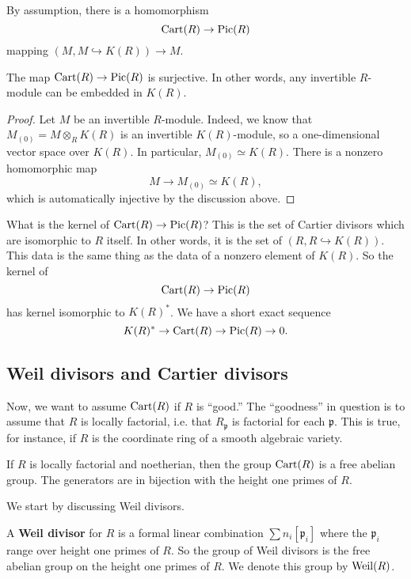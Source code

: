 By assumption, there is a homomorphism
\[ \operatorname{Cart}(R) \to\operatorname{Pic}(R)  \]
mapping $(M, M \hookrightarrow K(R)) \to M$. 

\begin{proposition} 
The map $\operatorname{Cart}(R) \to \operatorname{Pic}(R)$ is surjective. In other words, any invertible
$R$-module can be embedded in $K(R)$.
\end{proposition} 
\begin{proof}  Let $M$ be an invertible $R$-module.
Indeed, we know that $M_{(0)} = M \otimes_R K(R)$ is an invertible
$K(R)$-module, so a one-dimensional vector space over $K(R)$. In particular,
$M_{(0)} \simeq K(R)$. There is a nonzero homomorphic map
\[  M \to M_{(0) } \simeq K(R),  \]
which is automatically injective by the discussion above. 
\end{proof} 

What is the kernel of $\operatorname{Cart}(R) \to \operatorname{Pic}(R)$? This is the set of Cartier divisors which are
isomorphic to $R$ itself. In other words, it is the set of $(R, R
\hookrightarrow K(R))$. This data is the same thing as the data of a nonzero
element of $K(R)$. 
So the kernel of 
\[  \operatorname{Cart}(R) \to \operatorname{Pic}(R)  \]
has kernel isomorphic to $K(R)^*$. We have a short exact sequence
\[  K(R)^* \to \operatorname{Cart}(R) \to \operatorname{Pic}(R) \to 0.  \]

\subsection{Weil divisors and Cartier divisors}

Now, we want to assume $\operatorname{Cart}(R)$ if $R$ is ``good.'' The ``goodness'' in
question is to assume that $R$ is locally factorial, i.e. that
$R_{\mathfrak{p}}$ is factorial for each $\mathfrak{p}$. This is true, for
instance, if $R$ is the coordinate ring of a smooth algebraic variety.



\begin{proposition} 
If $R$ is locally factorial and noetherian, then the group $\operatorname{Cart}(R)$ is a free abelian group.
The generators are in bijection with the height one primes of $R$.
\end{proposition} 

We start by discussing Weil divisors.
\begin{definition} 
A \textbf{Weil divisor} for $R$ is a formal linear combination $\sum n_{i}
[\mathfrak{p}_i]$ where the $\mathfrak{p}_i$ range over height one primes of
$R$. So the group of Weil divisors is the free abelian group on the height one
primes of $R$. We denote this group by $\operatorname{Weil}(R)$.
\end{definition} 


